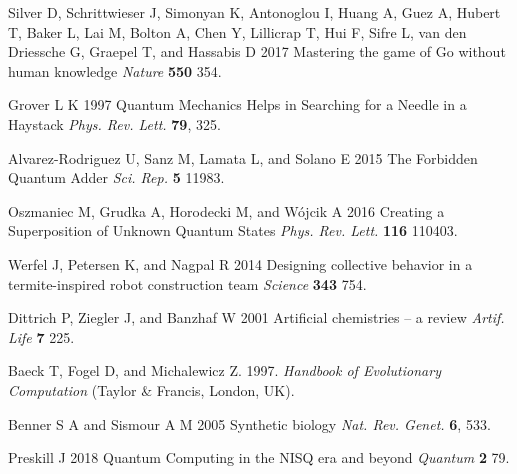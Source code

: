 \documentclass[12pt]{iopart}
\begin{document}
\begin{thebibliography}{999}
 Silver D, Schrittwieser J, Simonyan K, Antonoglou I, Huang A, Guez A, Hubert T, Baker L, Lai M, Bolton A, Chen Y, Lillicrap T, Hui F, Sifre L, van den Driessche G, Graepel T, and Hassabis D 2017 Mastering the game of Go without human knowledge {\it Nature} {\bf 550} 354.

 Grover L K 1997 Quantum Mechanics Helps in Searching for a Needle in a Haystack {\it Phys. Rev. Lett.} {\bf 79}, 325. 

 Alvarez-Rodriguez U, Sanz M, Lamata L, and Solano E 2015 The Forbidden Quantum Adder {\it Sci. Rep.} {\bf 5} 11983. 

 Oszmaniec M, Grudka A, Horodecki M, and W\'ojcik A 2016 Creating a Superposition of Unknown Quantum States {\it Phys. Rev. Lett.} {\bf 116} 110403.

 Werfel J, Petersen K, and Nagpal R 2014 Designing collective behavior in a termite-inspired robot construction team {\it Science} {\bf 343} 754.

 Dittrich P, Ziegler J, and Banzhaf W 2001 Artificial chemistries -- a review {\it Artif. Life} {\bf 7} 225.

 Baeck T, Fogel D, and Michalewicz Z. 1997. {\it Handbook of Evolutionary Computation} (Taylor \& Francis, London, UK).

 Benner S A and Sismour A M 2005 Synthetic biology {\it Nat. Rev. Genet.} {\bf 6}, 533.



 Preskill J 2018 Quantum Computing in the NISQ era and beyond {\it Quantum} {\bf 2} 79.

\end{thebibliography}
\end{document}
